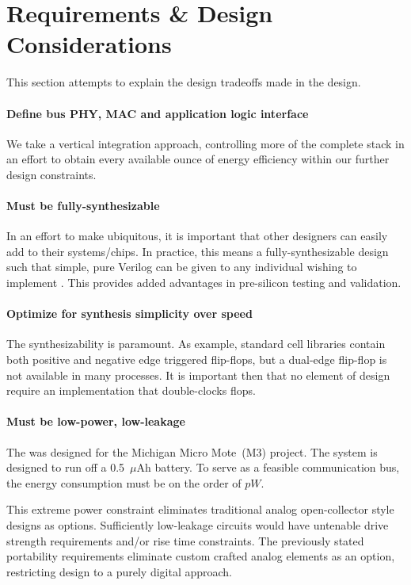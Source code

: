 \section{Requirements \& Design Considerations}
\label{sec:requirements}
\label{sec:design}
This section attempts to explain the design tradeoffs made in the \bus design.

\paragraph{Define bus PHY, MAC and application logic interface}
We take a vertical integration approach, controlling more of the complete
stack in an effort to obtain every available ounce of energy efficiency within
our further design constraints.

\paragraph{Must be fully-synthesizable}
In an effort to make \bus ubiquitous, it is important that other designers can
easily add \bus to their systems/chips. In practice, this means a
fully-synthesizable design such that simple, pure Verilog can be given to any
individual wishing to implement \bus. This provides added advantages in
pre-silicon testing and validation.

\paragraph{Optimize for synthesis simplicity over speed}
The synthesizability is paramount. As example, standard cell libraries contain
both positive and negative edge triggered flip-flops, but a dual-edge
flip-flop is not available in many processes. It is important then that no
element of \bus design require an implementation that double-clocks flops.

\paragraph{Must be low-power, low-leakage}
The \bus was designed for the Michigan Micro Mote~(M3) project. The system is
designed to run off a 0.5~$\mu$Ah battery. To serve as a feasible
communication bus, the energy consumption must be on the order of $pW$.

This extreme power constraint eliminates traditional analog open-collector
style designs as options. Sufficiently low-leakage circuits would have
untenable drive strength requirements and/or rise time constraints. The
previously stated portability requirements eliminate custom crafted analog
elements as an option, restricting \bus design to a purely digital approach.

